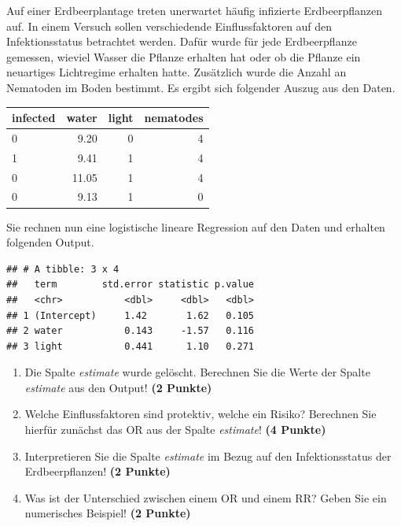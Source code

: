 \documentclass[a4paper, 10pt]{scrartcl}\usepackage[]{graphicx}\usepackage[]{xcolor}
\makeatletter
\newenvironment{kframe}{%
 \def\at@end@of@kframe{}%
 \ifinner\ifhmode%
  \def\at@end@of@kframe{\end{minipage}}%
  \begin{minipage}{\columnwidth}%
 \fi\fi%
 \def\FrameCommand##1{\hskip\@totalleftmargin \hskip-\fboxsep
 \colorbox{shadecolor}{##1}\hskip-\fboxsep
     \hskip-\linewidth \hskip-\@totalleftmargin \hskip\columnwidth}%
 \MakeFramed {\advance\hsize-\width
   \@totalleftmargin\z@ \linewidth\hsize
   \@setminipage}}%
 {\par\unskip\endMakeFramed%
 \at@end@of@kframe}
\newenvironment{knitrout}{}{} %
\makeatother
\begin{document}
Auf einer Erdbeerplantage treten unerwartet h{\"a}ufig infizierte
Erdbeerpflanzen auf. In einem Versuch sollen verschiedende Einflussfaktoren
auf den Infektionsstatus betrachtet werden. Daf{\"u}r wurde f{\"u}r jede
Erdbeerpflanze gemessen, wieviel Wasser die Pflanze erhalten hat oder ob
die Pflanze ein neuartiges Lichtregime erhalten hatte. Zus{\"a}tzlich wurde die
Anzahl an Nematoden im Boden bestimmt. Es ergibt sich folgender Auszug aus
den Daten.

\begin{knitrout}
\color{fgcolor}\begin{table}[!h]
\centering
\begin{tabular}{lrrr}
\toprule
infected & water & light & nematodes\\
\midrule
0 & 9.20 & 0 & 4\\
1 & 9.41 & 1 & 4\\
0 & 11.05 & 1 & 4\\
0 & 9.13 & 1 & 0\\
\bottomrule
\end{tabular}
\end{table}

\end{knitrout}

Sie rechnen nun eine logistische lineare Regression auf den Daten und erhalten
folgenden \Rlogo Output.

\begin{knitrout}
\color{fgcolor}\begin{kframe}
\begin{verbatim}
## # A tibble: 3 x 4
##   term        std.error statistic p.value
##   <chr>           <dbl>     <dbl>   <dbl>
## 1 (Intercept)     1.42       1.62   0.105
## 2 water           0.143     -1.57   0.116
## 3 light           0.441      1.10   0.271
\end{verbatim}
\end{kframe}
\end{knitrout}


\begin{enumerate}
\item Die Spalte \textit{estimate} wurde gel{\"o}scht. Berechnen Sie die Werte
  der Spalte \textit{estimate} aus den \Rlogo Output! \textbf{(2 Punkte)}
\item Welche Einflussfaktoren sind protektiv, welche ein Risiko? Berechnen
  Sie hierf{\"u}r zun{\"a}chst das OR aus der Spalte \textit{estimate}! \textbf{(4 Punkte)}
\item Interpretieren Sie die Spalte \textit{estimate} im Bezug auf den
  Infektionsstatus der Erdbeerpflanzen! \textbf{(2 Punkte)}
\item Was ist der Unterschied zwischen einem OR und einem RR? Geben Sie ein
  numerisches Beispiel! \textbf{(2 Punkte)}
\end{enumerate}
 
\end{document}
